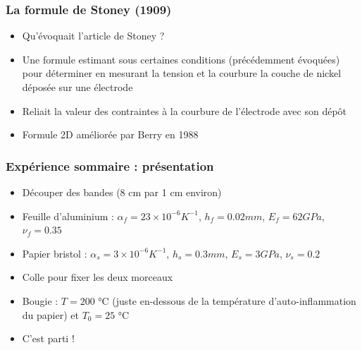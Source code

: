 
\begin{frame}
    \frametitle{La formule de Stoney (1909)}

    \begin{itemize}
        \item Qu'évoquait l'article de Stoney ?
        \item Une formule estimant sous certaines conditions (précédemment évoquées) pour déterminer en mesurant la tension et la courbure la couche de nickel déposée sur une électrode 
        \item Reliait la valeur des contraintes à la courbure de l'électrode avec son dépôt
        \item Formule 2D améliorée par Berry en 1988
    \end{itemize}
    
\end{frame}


\begin{frame}
\frametitle{Expérience sommaire : présentation}
\begin{itemize}
    \item Découper des bandes (8 cm par 1 cm environ)
    \item Feuille d'aluminium : $\alpha_f = 23 \times 10^{-6} K^{-1}$, $h_f = 0.02 mm$, $E_f = 62 GPa$, $\nu_f = 0.35$
    \item Papier bristol : $\alpha_s = 3 \times 10^{-6} K^{-1}$, $h_s = 0.3 mm$, $E_s = 3 GPa$, $\nu_s = 0.2$
    \item Colle pour fixer les deux morceaux
    \item Bougie : $T = 200$ °C (juste en-dessous de la température d'auto-inflammation du papier) et $T_0 = 25$ °C
    \item C'est parti !
\end{itemize}
\end{frame}


